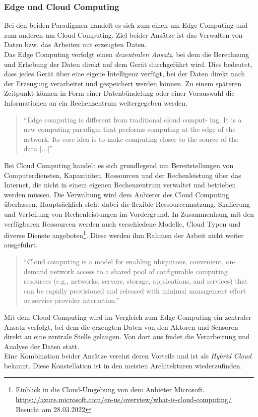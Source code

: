         \subsubsection*{Edge und Cloud Computing}
            Bei den beiden Paradigmen handelt es sich zum einen um Edge Computing und zum anderen um Cloud Computing. Ziel beider Ansätze ist das 
            Verwalten von Daten bzw. das Arbeiten mit erzeugten Daten.
            \\
            Das Edge Computing verfolgt einen \textit{dezentralen Ansatz}, bei dem die Berechnung und Erhebung der Daten direkt auf dem Gerät durchgeführt wird. %
            Dies bedeutet, dass jedes Gerät über eine eigene Intelligenz verfügt, bei der Daten direkt nach der Erzeugung verarbeitet und gespeichert werden können. 
            Zu einem späteren Zeitpunkt können in Form einer Datenbündelung oder einer Vorauswahl die Informationen an ein Rechenzentrum weitergegeben werden. 
            \begin{quote}
                “Edge computing is different from traditional cloud comput- ing. It is a new computing paradigm that performs computing at the edge 
                of the network. Its core idea is to make computing closer to the source of the data [...]” \cite{Cao2020}
            \end{quote}
            Bei Cloud Computing handelt es sich grundlegend um Bereitstellungen von Computerdiensten, Kapazitäten, Ressourcen und der Rechenleistung über 
            das Internet, die nicht in einem eigenen Rechenzentrum 
            verwaltet und betrieben werden müssen. Die Verwaltung wird dem Anbieter des Cloud Computing überlassen. Hauptsächlich steht dabei die 
            flexible Ressourcennutzung, Skalierung und Verteilung von Rechenleistungen im Vordergrund. In Zusammenhang mit den verfügbaren Ressourcen 
            werden auch verschiedene Modelle, Cloud Typen und diverse Dienste angeboten\footnote{Einblick in die Cloud-Umgebung von dem Anbieter Microsoft. \url{https://azure.microsoft.com/en-us/overview/what-is-cloud-computing/} Besucht am 28.03.2022}. 
            Diese werden ihm Rahmen der Arbeit nicht weiter ausgeführt.
            \begin{quote}
                “Cloud computing is a model for enabling ubiquitous, convenient, on-demand network access to a shared pool of configurable 
                computing resources (e.g., networks, servers, storage, applications, and services) that can be rapidly provisioned and 
                released with minimal management effort or service provider interaction.” \cite{Mell2011}
            \end{quote}
            Mit dem Cloud Computing wird im Vergleich zum Edge Computing ein zentraler Ansatz verfolgt, bei dem die erzeugten Daten von den Aktoren und 
            Sensoren direkt an eine zentrale Stelle gelangen. Von dort aus findet die Verarbeitung und Analyse der Daten statt. 
            \\
            Eine Kombination beider Ansätze vereint deren Vorteile und ist als \textit{Hybrid Cloud} bekannt. Diese Konstellation ist in den meisten 
            Architekturen wiederzufinden. 
    
